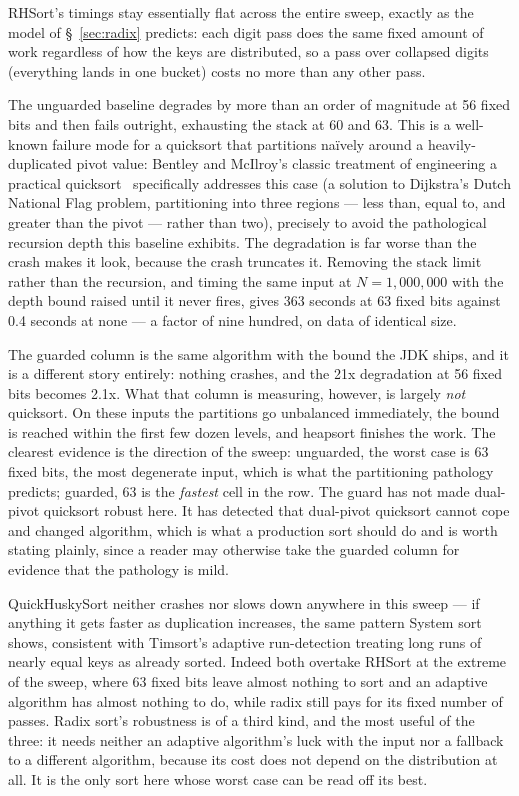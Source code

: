 \documentclass[twoside,leqno,twocolumn]{article}
\begin{document}
RHSort's timings stay essentially flat across the entire sweep, exactly as the model of \S~\ref{sec:radix} predicts:
each digit pass does the same fixed amount of work regardless of how the keys are distributed,
so a pass over collapsed digits (everything lands in one bucket) costs no more than any other pass.

The unguarded baseline degrades by more than an order of magnitude at 56 fixed bits and then fails
outright, exhausting the stack at 60 and 63.
This is a well-known failure mode for a quicksort that partitions naïvely around a heavily-duplicated pivot value:
Bentley and McIlroy's classic treatment of engineering a practical quicksort~\cite{10.1002/spe.4380231105}
specifically addresses this case (a solution to Dijkstra's Dutch National Flag problem, partitioning into three regions — less than, equal to,
and greater than the pivot — rather than two), precisely to avoid the pathological recursion depth this baseline exhibits.
The degradation is far worse than the crash makes it look, because the crash truncates it.
Removing the stack limit rather than the recursion, and timing the same input at $N=1{,}000{,}000$ with the
depth bound raised until it never fires, gives 363 seconds at 63 fixed bits against 0.4 seconds at none —
a factor of nine hundred, on data of identical size.

The guarded column is the same algorithm with the bound the JDK ships, and it is a different story
entirely: nothing crashes, and the 21x degradation at 56 fixed bits becomes 2.1x.
What that column is measuring, however, is largely \emph{not} quicksort.
On these inputs the partitions go unbalanced immediately, the bound is reached within the first few dozen
levels, and heapsort finishes the work.
The clearest evidence is the direction of the sweep: unguarded, the worst case is 63 fixed bits, the most
degenerate input, which is what the partitioning pathology predicts; guarded, 63 is the \emph{fastest}
cell in the row.
The guard has not made dual-pivot quicksort robust here.
It has detected that dual-pivot quicksort cannot cope and changed algorithm, which is what a
production sort should do and is worth stating plainly, since a reader may otherwise take the guarded
column for evidence that the pathology is mild.

QuickHuskySort neither crashes nor slows down anywhere in this sweep — if anything it gets faster as duplication increases,
the same pattern System sort shows,
consistent with Timsort's adaptive run-detection treating long runs of nearly equal keys as already sorted.
Indeed both overtake RHSort at the extreme of the sweep,
where 63 fixed bits leave almost nothing to sort and an adaptive algorithm has almost nothing to do,
while radix still pays for its fixed number of passes.
Radix sort's robustness is of a third kind, and the most useful of the three:
it needs neither an adaptive algorithm's luck with the input nor a fallback to a different algorithm,
because its cost does not depend on the distribution at all.
It is the only sort here whose worst case can be read off its best.
\end{document}
